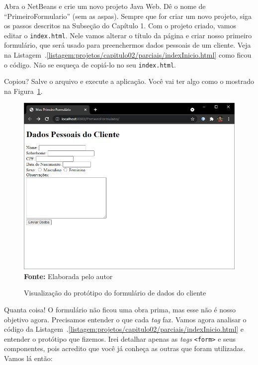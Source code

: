 Abra o NetBeans e crie um novo projeto Java Web. Dê o nome de ``PrimeiroFormulario'' (sem as aspas). Sempre que for criar um novo projeto, siga os passos descritos na Subseção \label{subsec:primeiroProjeto} do Capítulo 1. Com o projeto criado, vamos editar o \texttt{index.html}. Nele vamos alterar o título da página e criar nosso primeiro formulário, que será usado para preenchermos dados pessoais de um cliente. Veja na Listagem~\thechapter.\ref{listagem:projetos/capitulo02/parciais/indexInicio.html} como ficou o código. Não se esqueça de copiá-lo no seu \texttt{index.html}.


Copiou? Salve o arquivo e execute a aplicação. Você vai ter algo como o mostrado na Figura~\ref{fig:cap02PrimeiroFormulario}.

\FloatBarrier
\begin{figure}[!htbp]
    \centering
    \caption{Visualização do protótipo do formulário de dados do cliente}
    \includegraphics[scale=0.7]{imagens/cap02PrimeiroFormulario}
    \\\textbf{Fonte:} Elaborada pelo autor
    \label{fig:cap02PrimeiroFormulario}
\end{figure}
\FloatBarrier

Quanta coisa! O formulário não ficou uma obra prima, mas esse não é nosso objetivo agora. Precisamos entender o que cada \textit{tag} faz. Vamos agora analisar o código da Listagem~\thechapter.\ref{listagem:projetos/capitulo02/parciais/indexInicio.html} e entender o protótipo que fizemos. Irei detalhar apenas as \textit{tags} \texttt{<form>} e seus componentes, pois acredito que você já conheça as outras que foram utilizadas. Vamos lá então:

